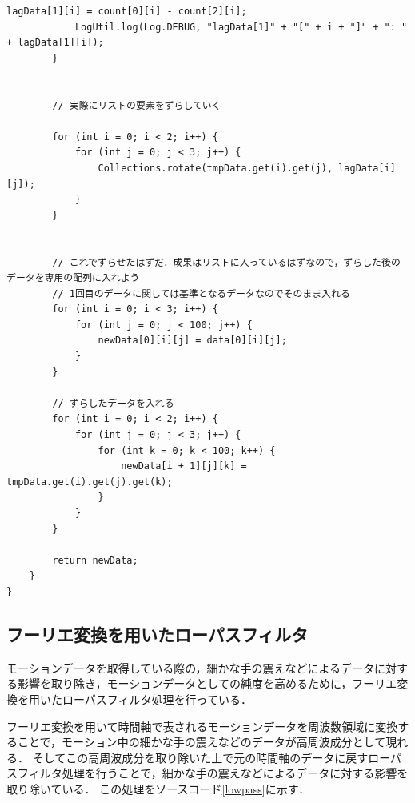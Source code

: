 \documentclass[11pt]{jreport}
\begin{document}
\begin{lstlisting}[caption=ズレ修正アルゴリズム, label=correctDeviation]
            lagData[1][i] = count[0][i] - count[2][i];
            LogUtil.log(Log.DEBUG, "lagData[1]" + "[" + i + "]" + ": " + lagData[1][i]);
        }


        // 実際にリストの要素をずらしていく

        for (int i = 0; i < 2; i++) {
            for (int j = 0; j < 3; j++) {
                Collections.rotate(tmpData.get(i).get(j), lagData[i][j]);
            }
        }


        // これでずらせたはずだ．成果はリストに入っているはずなので，ずらした後のデータを専用の配列に入れよう
        // 1回目のデータに関しては基準となるデータなのでそのまま入れる
        for (int i = 0; i < 3; i++) {
            for (int j = 0; j < 100; j++) {
                newData[0][i][j] = data[0][i][j];
            }
        }

        // ずらしたデータを入れる
        for (int i = 0; i < 2; i++) {
            for (int j = 0; j < 3; j++) {
                for (int k = 0; k < 100; k++) {
                    newData[i + 1][j][k] = tmpData.get(i).get(j).get(k);
                }
            }
        }

        return newData;
    }
}
        \end{lstlisting}

        \subsection{フーリエ変換を用いたローパスフィルタ}
        モーションデータを取得している際の，細かな手の震えなどによるデータに対する影響を取り除き，モーションデータとしての純度を高めるために，フーリエ変換を用いたローパスフィルタ処理を行っている．

        フーリエ変換を用いて時間軸で表されるモーションデータを周波数領域に変換することで，モーション中の細かな手の震えなどのデータが高周波成分として現れる．
        そしてこの高周波成分を取り除いた上で元の時間軸のデータに戻すローパスフィルタ処理を行うことで，細かな手の震えなどによるデータに対する影響を取り除いている．
        この処理をソースコード\ref{lowpass}に示す．
\end{document}
